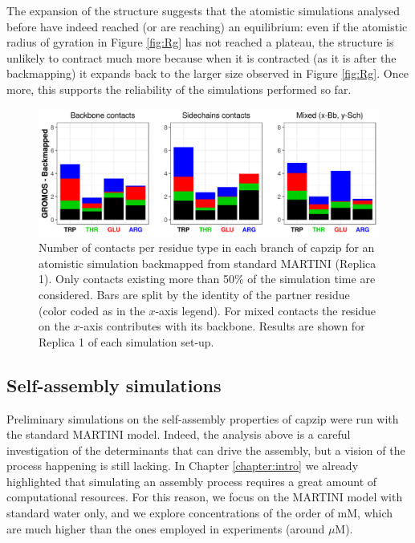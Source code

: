 The expansion of the structure suggests that the atomistic simulations analysed before have indeed reached (or are reaching) an equilibrium: even if the atomistic radius of gyration in Figure \ref{fig:Rg} has not reached a plateau, the structure is unlikely to contract much more because when it is contracted (as it is after the backmapping) it expands back to the larger size observed in Figure \ref{fig:Rg}.
Once more, this supports the reliability of the simulations performed so far.

\begin{figure}[t!]
\centering\includegraphics[width=0.95\linewidth]{3results_capsule/pics/contacts_BM.png} 
\caption[Backmapping simulations: contacts]{Number of contacts per residue type in each branch of capzip for an atomistic simulation backmapped from standard MARTINI (Replica 1). Only contacts existing more than 50\% of the simulation time are considered. Bars are split by the identity of the partner residue (color coded as in the $x$-axis legend). For mixed contacts the residue on the $x$-axis contributes with its backbone. Results are shown for Replica 1 of each simulation set-up.}
\label{fig:BM_contacts}
\end{figure}

\subsection{Self-assembly simulations}
Preliminary simulations on the self-assembly properties of capzip were run with the standard MARTINI model. Indeed, the analysis above is a careful investigation of the determinants that can drive the assembly, but a vision of the process happening is still lacking.
%
In Chapter \ref{chapter:intro} we already highlighted that simulating an assembly process requires a great amount of computational resources. For this reason, we focus on the MARTINI model with standard water only, and we explore concentrations of the order of mM, which are much higher than the ones employed in experiments (around $\mu$M).


